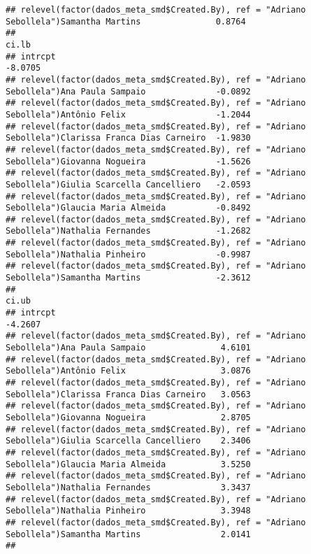\documentclass[
]{article}
\begin{document}
\begin{verbatim}
## relevel(factor(dados_meta_smd$Created.By), ref = "Adriano Sebollela")Samantha Martins               0.8764 
##                                                                                                       ci.lb 
## intrcpt                                                                                             -8.0705 
## relevel(factor(dados_meta_smd$Created.By), ref = "Adriano Sebollela")Ana Paula Sampaio              -0.0892 
## relevel(factor(dados_meta_smd$Created.By), ref = "Adriano Sebollela")Antônio Felix                  -1.2044 
## relevel(factor(dados_meta_smd$Created.By), ref = "Adriano Sebollela")Clarissa Franca Dias Carneiro  -1.9830 
## relevel(factor(dados_meta_smd$Created.By), ref = "Adriano Sebollela")Giovanna Nogueira              -1.5626 
## relevel(factor(dados_meta_smd$Created.By), ref = "Adriano Sebollela")Giulia Scarcella Cancelliero   -2.0593 
## relevel(factor(dados_meta_smd$Created.By), ref = "Adriano Sebollela")Glaucia Maria Almeida          -0.8492 
## relevel(factor(dados_meta_smd$Created.By), ref = "Adriano Sebollela")Nathalia Fernandes             -1.2682 
## relevel(factor(dados_meta_smd$Created.By), ref = "Adriano Sebollela")Nathalia Pinheiro              -0.9987 
## relevel(factor(dados_meta_smd$Created.By), ref = "Adriano Sebollela")Samantha Martins               -2.3612 
##                                                                                                       ci.ub 
## intrcpt                                                                                             -4.2607 
## relevel(factor(dados_meta_smd$Created.By), ref = "Adriano Sebollela")Ana Paula Sampaio               4.6101 
## relevel(factor(dados_meta_smd$Created.By), ref = "Adriano Sebollela")Antônio Felix                   3.0876 
## relevel(factor(dados_meta_smd$Created.By), ref = "Adriano Sebollela")Clarissa Franca Dias Carneiro   3.0563 
## relevel(factor(dados_meta_smd$Created.By), ref = "Adriano Sebollela")Giovanna Nogueira               2.8705 
## relevel(factor(dados_meta_smd$Created.By), ref = "Adriano Sebollela")Giulia Scarcella Cancelliero    2.3406 
## relevel(factor(dados_meta_smd$Created.By), ref = "Adriano Sebollela")Glaucia Maria Almeida           3.5250 
## relevel(factor(dados_meta_smd$Created.By), ref = "Adriano Sebollela")Nathalia Fernandes              3.3437 
## relevel(factor(dados_meta_smd$Created.By), ref = "Adriano Sebollela")Nathalia Pinheiro               3.3948 
## relevel(factor(dados_meta_smd$Created.By), ref = "Adriano Sebollela")Samantha Martins                2.0141 
##                                                                                                         

\end{verbatim}
\end{document}
